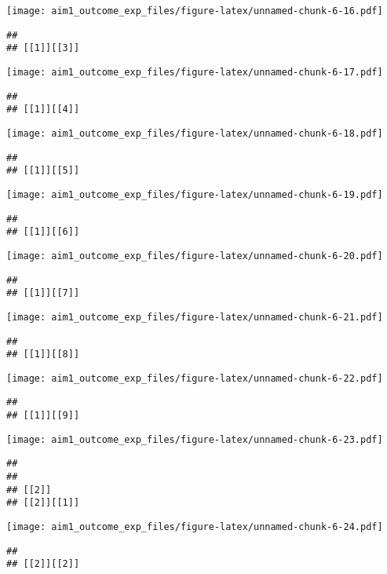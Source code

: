 \documentclass[
]{article}
\begin{document}
\texttt{[image: aim1\_outcome\_exp\_files/figure-latex/unnamed-chunk-6-16.pdf]}

\begin{verbatim}
## 
## [[1]][[3]]
\end{verbatim}

\texttt{[image: aim1\_outcome\_exp\_files/figure-latex/unnamed-chunk-6-17.pdf]}

\begin{verbatim}
## 
## [[1]][[4]]
\end{verbatim}

\texttt{[image: aim1\_outcome\_exp\_files/figure-latex/unnamed-chunk-6-18.pdf]}

\begin{verbatim}
## 
## [[1]][[5]]
\end{verbatim}

\texttt{[image: aim1\_outcome\_exp\_files/figure-latex/unnamed-chunk-6-19.pdf]}

\begin{verbatim}
## 
## [[1]][[6]]
\end{verbatim}

\texttt{[image: aim1\_outcome\_exp\_files/figure-latex/unnamed-chunk-6-20.pdf]}

\begin{verbatim}
## 
## [[1]][[7]]
\end{verbatim}

\texttt{[image: aim1\_outcome\_exp\_files/figure-latex/unnamed-chunk-6-21.pdf]}

\begin{verbatim}
## 
## [[1]][[8]]
\end{verbatim}

\texttt{[image: aim1\_outcome\_exp\_files/figure-latex/unnamed-chunk-6-22.pdf]}

\begin{verbatim}
## 
## [[1]][[9]]
\end{verbatim}

\texttt{[image: aim1\_outcome\_exp\_files/figure-latex/unnamed-chunk-6-23.pdf]}

\begin{verbatim}
## 
## 
## [[2]]
## [[2]][[1]]
\end{verbatim}

\texttt{[image: aim1\_outcome\_exp\_files/figure-latex/unnamed-chunk-6-24.pdf]}

\begin{verbatim}
## 
## [[2]][[2]]
\end{verbatim}
\end{document}
